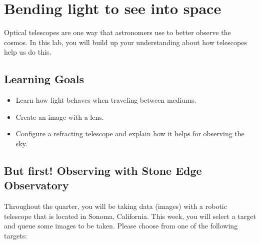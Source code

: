 \chapter{Bending light to see into space}

Optical telescopes are one way that astronomers use to better observe the cosmos. In this lab, you will build up your understanding about how telescopes help us do this.

\section{Learning Goals}

\begin{itemize}
	\item Learn how light behaves when traveling between mediums.
	
	\item Create an image with a lens.
	
	\item Configure a refracting telescope and explain how it helps for observing the sky.
\end{itemize}

\section{But first! Observing with Stone Edge Observatory}

Throughout the quarter, you will be taking data (images) with a robotic telescope that is located in Sonoma, California. This week, you will select a target and queue some images to be taken. Please choose from one of the following targets:

